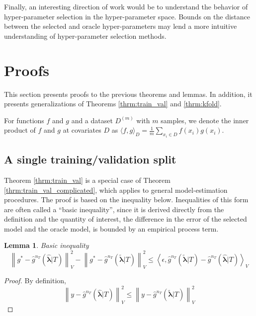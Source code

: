 \documentclass[12pt]{article}
\newtheorem{lemma}{Lemma}
\begin{document}
Finally, an interesting direction of work would be to understand the behavior of hyper-parameter selection in the hyper-parameter space. Bounds on the distance between the selected and oracle hyper-parameters may lend a more intuitive understanding of hyper-parameter selection methods.

\section{Proofs} \label{sec:proofs}

This section presents proofs to the previous theorems and lemmas. In addition, it presents generalizations of Theorems \ref{thrm:train_val} and \ref{thrm:kfold}.

For functions $f$ and $g$ and a dataset $D^{(m)}$ with $m$ samples, we denote the inner product of $f$ and $g$ at covariates $D$ as $\langle f,g \rangle_D = \frac{1}{m} \sum_{x_i \in D} f(x_i) g(x_i) $.

\subsection{A single training/validation split}
\label{appendix:train_val}

Theorem \ref{thrm:train_val} is a special case of Theorem \ref{thrm:train_val_complicated}, which applies to general model-estimation procedures. The proof is based on the inequality below. Inequalities of this form are often called a ``basic inequality'', since it is derived directly from the definition and the quantity of interest, the difference in the error of the selected model and the oracle model, is bounded by an empirical process term.

\begin{lemma}{Basic inequality}
	\begin{equation}
	\label{thrm:basic_ineq}
	\left \| g^* - \hat{g}^{n_T}(\hat{\boldsymbol{\lambda}}|T) \right \|^2_V 
	- \left \| g^* - \hat{g}^{n_T}(\tilde{\boldsymbol{\lambda}}|T) \right \|^2_V
	\le 
	\left \langle \epsilon, \hat{g}^{n_T}(\tilde{\boldsymbol{\lambda}}|T) - \hat{g}^{n_T}(\hat{\boldsymbol{\lambda}}|T) \right \rangle_V
	\end{equation}
\end{lemma}

\begin{proof}
	By definition,
	\begin{equation}
	\left \| y - \hat{g}^{n_T}(\hat{\boldsymbol{\lambda}}|T) \right \|^2_V \le 
	\left \| y - \hat{g}^{n_T}(\tilde{\boldsymbol{\lambda}}|T) \right \|^2_V
	\end{equation}
\end{proof}
\end{document}

